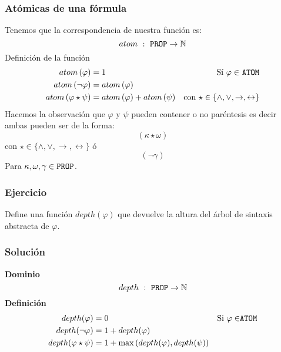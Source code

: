 \documentclass[a4paper]{article}
\begin{document}
\subsubsection{Atómicas de una fórmula}
\noindent
Tenemos que la correspondencia de nuestra función es:
\[
      atom \ : \ \text{\texttt{PROP}} \to \mathbb{N}
\]
Definición de la función
\begin{align*}
    atom\left(\varphi\right) &= 1 &\text{Sí \(\varphi \in\) \texttt{ATOM}} \\
    atom\left(\neg \varphi\right) &= atom\left(\varphi\right) & \\
    atom\left(\varphi \star \psi \right) &= atom\left(\varphi\right) + atom\left(\psi\right) & \text{con \(\star \in \{\land, \lor, \rightarrow, \leftrightarrow \}\)} \\
\end{align*}
Hacemos la observación que \(\varphi\) y \(\psi\) pueden contener o no paréntesis es decir ambas pueden ser de la forma:
\[
    \left(\kappa \star \omega \right)  
\]
con \(\star \in \{ \land, \lor, \rightarrow, \leftrightarrow \}\) ó
\[
    \left(\neg \gamma\right)
\]
Para \(\kappa, \omega, \gamma \in \text{\texttt{PROP}}\).
\subsubsection{Ejercicio}
\noindent
Define una función \(depth\left(\varphi\right)\) que devuelve la altura del árbol de sintaxis abstracta de \(\varphi\).
\subsubsection{Solución}
\textbf{Dominio}
\[
    depth \ : \ \text{\texttt{PROP}} \to \mathbb{N}
\]
\textbf{Definición}
\begin{align*}
    depth(\varphi) &= 0 &\text{Si \(\varphi \in\)\texttt{ATOM}} \\
    depth(\neg \varphi) &= 1 + depth(\varphi) & \\
    depth(\varphi \star \psi) &= 1 + \max{(depth(\varphi), depth(\psi))} &
\end{align*}
\end{document}
